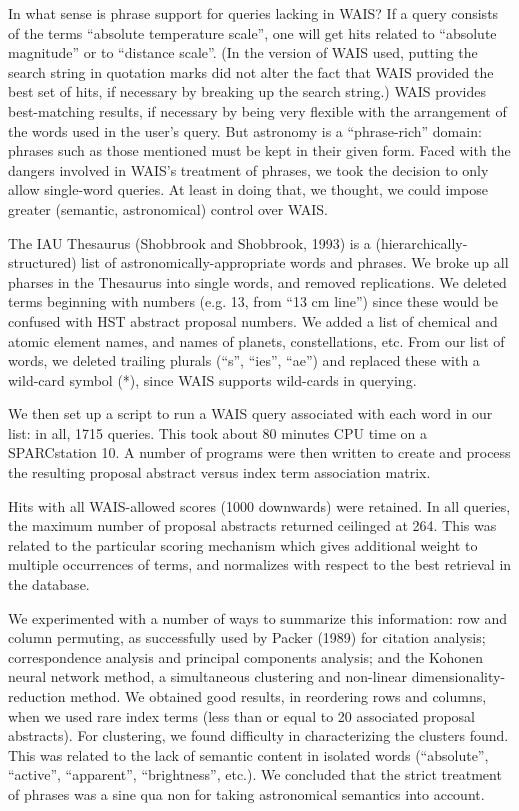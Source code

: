 In what sense 
is phrase support for queries lacking in WAIS?  If a query
consists of the terms ``absolute temperature scale'', one will get hits 
related to ``absolute magnitude'' or to ``distance scale''. (In the version
of WAIS used, putting the search string in quotation marks did not alter
the fact that WAIS provided the best set of hits, if necessary by 
breaking up the search string.)  WAIS provides
best-matching results, if necessary by being very flexible with the 
arrangement of the words used in the user's query.  But astronomy is a 
``phrase-rich'' domain: phrases such as those mentioned must be kept in their
given form.  Faced with the dangers involved in WAIS's treatment of phrases,
we took the decision to only allow single-word queries.  At least in doing
that, we thought, we could impose greater (semantic, astronomical) control
over WAIS.

The IAU Thesaurus (Shobbrook and Shobbrook, 1993) is a 
(hierarchically-structured) list of 
astronomically-appropriate words and phrases.  We broke up all pharses in the
Thesaurus
into single words, and removed replications.  We deleted terms beginning
with numbers (e.g. 13, from ``13 cm line'') since these would be confused
with HST abstract proposal numbers.  We added a list of chemical and 
atomic element
names, and names of planets, constellations, etc.  From our list of 
words, we deleted trailing plurals (``s'', ``ies'', ``ae'') and replaced 
these with a wild-card symbol (*), since WAIS supports wild-cards in 
querying.  

We then set up a script to run a WAIS query associated with each word in our
list: in all, 1715 queries.  This took about 80 minutes CPU time on a 
SPARCstation 10.  A number of programs were then written to create and
process the resulting proposal abstract versus index term association matrix. 

Hits with all WAIS-allowed scores (1000 downwards) were retained. 
In all queries, the maximum number of proposal abstracts returned ceilinged
at 264.  This was related to the particular scoring mechanism which gives 
additional weight to multiple occurrences of terms, and 
normalizes with respect to the best retrieval in the database.

We experimented with a number of ways to summarize this
information: row and column permuting, as successfully used by Packer (1989)
for citation analysis; correspondence analysis and principal components
analysis; and the Kohonen neural network method, a simultaneous 
clustering and non-linear dimensionality-reduction method.  We obtained
good results, in reordering rows and columns, when we used rare index terms
(less than or equal to 20 associated proposal abstracts).  For clustering,
we found difficulty in characterizing the clusters found.  
This was related to the lack of semantic content in isolated
words (``absolute'', ``active'', ``apparent'', ``brightness'', etc.).  We
concluded that the strict treatment of phrases was a sine qua non for
taking astronomical semantics into account. 



